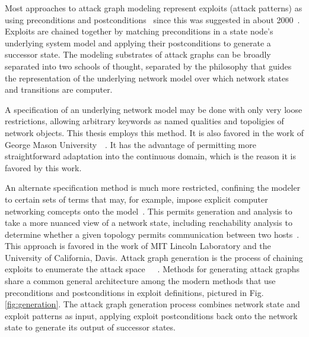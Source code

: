 Most approaches to attack graph modeling represent exploits (attack patterns) as using
preconditions and postconditions~\cite{lippmann2005annotated} since this was suggested in about 2000~\cite{templeton2001requires}. Exploits are chained together by matching preconditions in a state node's
underlying system model and applying their postconditions to generate a successor state.
The modeling substrates of attack graphs can be broadly separated into two schools of
thought, separated by the philosophy that guides the representation of the underlying
network model over which network states and transitions are computer.

A specification of an underlying network model may be done with only very loose
restrictions, allowing arbitrary keywords as named qualities and topoligies of network objects.
This thesis employs this method. It is also favored in the work of George Mason 
University~\cite{ammann2002scalable}~\cite{wang2006minimum}. It has the advantage of
permitting more straightforward adaptation into the continuous domain, which is the reason
it is favored by this work. 

An alternate specification method is much more restricted, confining the modeler to
certain sets of terms that may, for example, impose explicit computer networking 
comcepts onto the model~\cite{templeton2001requires}.
This permits generation and analysis to take a
more nuanced view of a network state, including reachability analysis to determine whether a
given topology permits communication between two hosts~\cite{ingols2009modeling}. This approach
is favored in the work of MIT Lincoln Laboratory and the University of California, Davis.
Attack graph generation is the process of chaining exploits to enumerate the
attack space~\cite{campbell2002modeling}~\cite{phillips1998graph}~\cite{sheyner2002automated}.
Methods for generating attack graphs
share a common general architecture among the modern
methods that use preconditions and postconditions in exploit definitions,
pictured in Fig. \ref{fig:generation}. The attack graph generation
process combines network state and exploit patterns as input, applying exploit postconditions
back onto the network state to generate its output of successor states.

